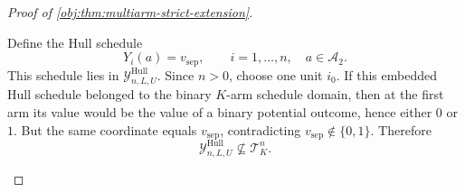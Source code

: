 \begin{proof}[Proof of \cref{obj:thm:multiarm-strict-extension}]
\begin{enumerate}
Define the Hull schedule
\[
Y_i(a)=v_{\mathrm{sep}},
\qquad
i=1,\ldots,n,\quad a\in\mathcal A_2 .
\]
This schedule lies in \(\mathcal Y^{\mathrm{Hull}}_{n,L,U}\). Since \(n>0\), choose one unit \(i_0\). If this embedded Hull schedule belonged to the binary \(K\)-arm schedule domain, then at the first arm its value would be the value of a binary potential outcome, hence either \(0\) or \(1\). But the same coordinate equals \(v_{\mathrm{sep}}\), contradicting \(v_{\mathrm{sep}}\notin\{0,1\}\). Therefore
\[
\mathcal Y^{\mathrm{Hull}}_{n,L,U}\nsubseteq \mathcal T_K^n .
\]
\end{enumerate}
\end{proof}
